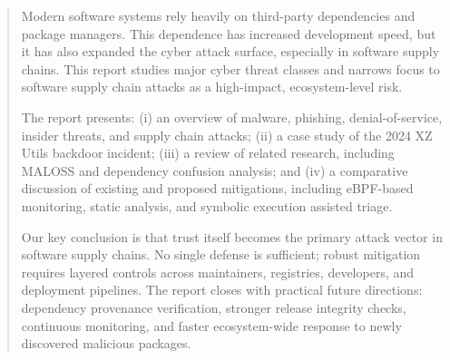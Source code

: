 \begin{abstract}
Modern software systems rely heavily on third-party dependencies and package managers.
This dependence has increased development speed, but it has also expanded the cyber attack surface,
especially in software supply chains. This report studies major cyber threat classes and narrows focus
to software supply chain attacks as a high-impact, ecosystem-level risk.

The report presents: (i) an overview of malware, phishing, denial-of-service, insider threats, and
supply chain attacks; (ii) a case study of the 2024 XZ Utils backdoor incident; (iii) a review of related
research, including MALOSS and dependency confusion analysis; and (iv) a comparative discussion of
existing and proposed mitigations, including eBPF-based monitoring, static analysis, and symbolic
execution assisted triage.

Our key conclusion is that trust itself becomes the primary attack vector in software supply chains.
No single defense is sufficient; robust mitigation requires layered controls across maintainers,
registries, developers, and deployment pipelines. The report closes with practical future directions:
dependency provenance verification, stronger release integrity checks, continuous monitoring, and
faster ecosystem-wide response to newly discovered malicious packages.

\end{abstract}
